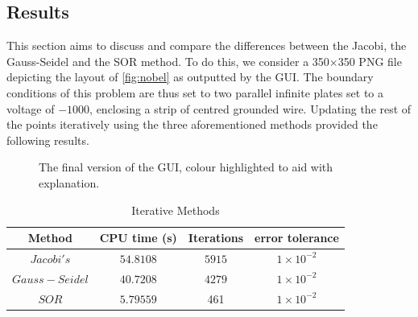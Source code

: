 \documentclass[a4paper]{article}
\begin{document}
\subsection{Results}
This section aims to discuss and compare the differences between the Jacobi, 
the Gauss-Seidel and the SOR method. To do this, we consider a 350$\times$350
PNG file depicting the layout of \ref{fig:nobel} as outputted by the GUI. The
boundary conditions of this problem are thus set to two parallel infinite
plates set to a voltage of $-1000$, enclosing a strip of centred grounded wire.
Updating the rest of the points iteratively using the three aforementioned
methods provided the following results.
\begin{figure}[!h]
  \centering
  \hfill
  \caption{The final version of the GUI, colour highlighted to aid with 
explanation.}
  \label{fig:results}
\end{figure}

\begin{table}[h!]
\centering
\begin{tabular}{| c | c | c | c |}
\hline
Method & CPU time (s) & Iterations & error tolerance\\
\hline\hline
$Jacobi's$ & $54.8108$ & $5915$ & $1 \times 10^{-2}$\\
\hline
$Gauss-Seidel$ & $40.7208$ & $4279$ & $1 \times 10^{-2}$\\
\hline
$SOR$ & $5.79559$ & 461 & $1 \times 10^{-2}$\\
\hline
\end{tabular}
\caption{Iterative Methods}
\label{table:methods}
\end{table}
\end{document}
